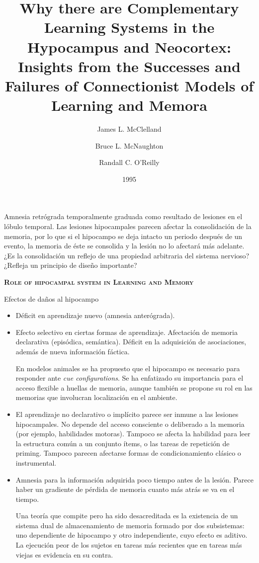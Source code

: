 \documentclass[a4paper,12pt]{article}
\title{Why there are Complementary Learning Systems in the Hypocampus and Neocortex: Insights from the Successes and Failures of Connectionist Models of Learning and Memora}
\author{James L. McClelland \and Bruce L. McNaughton \and Randall C. O'Reilly}
\date{1995}
\begin{document}
{\scshape\bfseries \maketitle}

Amnesia retrógrada temporalmente graduada como resultado de lesiones en el lóbulo temporal. Las lesiones hipocampales parecen afectar la consolidación de la memoria, por lo que si el hipocampo se deja intacto un periodo después de un evento, la memoria de éste se consolida y la lesión no lo afectará más adelante. ¿Es la consolidación un reflejo de una propiedad arbitraria del sistema nervioso? ¿Refleja un principio de diseño importante?

{\scshape\bfseries Role of hipocampal system in Learning and Memory}

Efectos de daños al hipocampo
\begin{itemize}
	\item Déficit en aprendizaje nuevo (amnesia anterógrada).
	\item Efecto selectivo en ciertas formas de aprendizaje. Afectación de memoria declarativa (episódica, semántica). Déficit en la adquisición de asociaciones, además de nueva información fáctica.

		En modelos animales se ha propuesto que el hipocampo es necesario para responder ante {\itshape cue configurations}. Se ha enfatizado su importancia para el acceso flexible a huellas de memoria, aunque también se propone su rol en las memorias que involucran localización en el ambiente. 
	\item El aprendizaje no declarativo o implícito parece ser inmune a las lesiones hipocampales. No depende del acceso consciente o deliberado a la memoria (por ejemplo, habilidades motoras). Tampoco se afecta la habilidad para leer la estructura común a un conjunto ítems, o las tareas de repetición de priming. Tampoco parecen afectarse formas de condicionamiento clásico o instrumental.
	\item Amnesia para la información adquirida poco tiempo antes de la lesión. Parece haber un gradiente de pérdida de memoria cuanto más atrás se va en el tiempo.

		Una teoría que compite pero ha sido desacreditada es la existencia de un sistema dual de almacenamiento de memoria formado por dos subsistemas: uno dependiente de hipocampo y otro independiente, cuyo efecto es aditivo. La ejecución peor de los sujetos en tareas más recientes que en tareas más viejas es evidencia en su contra.
\end{itemize}
\end{document}
